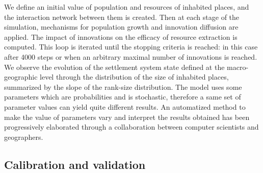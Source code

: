 \documentclass[10pt]{article}
\begin{document}
We define an initial value of population and resources of inhabited places, and the interaction network between them is created. Then at each stage of the simulation, mechanisms for population growth and innovation diffusion are applied. The impact of innovations on the efficacy of resource extraction is computed. This loop is iterated until the stopping criteria is reached: in this case after 4000 steps or when an arbitrary maximal number of innovations is reached. We observe the evolution of the settlement system state defined at the macro-geographic level through the distribution of the size of inhabited places, summarized by the slope of the rank-size distribution. The model uses some parameters which are probabilities and is stochastic, therefore a same set of parameter values can yield quite different results. An automatized method to make the value of parameters vary and interpret the results obtained has been progressively elaborated through a collaboration between computer scientists and geographers.



\subsection{Calibration and validation}
\end{document}
